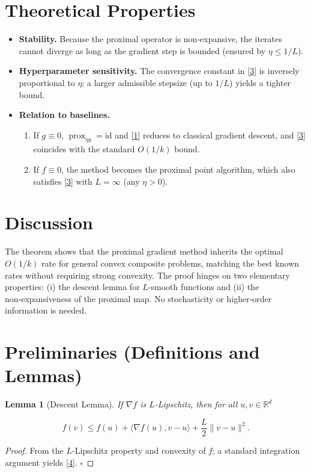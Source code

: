 \documentclass{article}
\newtheorem{lemma}{Lemma}
\newcommand{\prox}{\operatorname{prox}}
\newcommand{\R}{\mathbb{R}}
\begin{document}
\section*{Theoretical Properties}
\begin{itemize}
\item \textbf{Stability.} Because the proximal operator is non‑expansive, the iterates cannot diverge as long as the gradient step is bounded (ensured by $\eta\le 1/L$).
\item \textbf{Hyperparameter sensitivity.} The convergence constant in \eqref{3} is inversely proportional to $\eta$; a larger admissible stepsize (up to $1/L$) yields a tighter bound.
\item \textbf{Relation to baselines.}
    \begin{enumerate}[label=(\alph*)]
        \item If $g\equiv0$, $\prox_{\eta g}=\text{id}$ and \eqref{1} reduces to classical gradient descent, and \eqref{3} coincides with the standard $O(1/k)$ bound.
        \item If $f\equiv0$, the method becomes the proximal point algorithm, which also satisfies \eqref{3} with $L=\infty$ (any $\eta>0$).
    \end{enumerate}
\end{itemize}

\section*{Discussion}
The theorem shows that the proximal gradient method inherits the optimal $O(1/k)$ rate for general convex composite problems, matching the best known rates without requiring strong convexity. The proof hinges on two elementary properties: (i) the descent lemma for $L$‑smooth functions and (ii) the non‑expansiveness of the proximal map. No stochasticity or higher‑order information is needed.

\newpage
\section*{Preliminaries (Definitions and Lemmas)}
\begin{lemma}[Descent Lemma]\label{lem:descent}
If $\nabla f$ is $L$‑Lipschitz, then for all $u,v\in\R^{d}$  

\[
f(v)\le f(u)+\langle\nabla f(u),v-u\rangle+\frac{L}{2}\|v-u\|^{2}.
\tag{4}
\]
\end{lemma}
\begin{proof}
From the $L$‑Lipschitz property and convexity of $f$; a standard integration argument yields \eqref{4}. \hfill $\square$
\end{proof}
\end{document}
